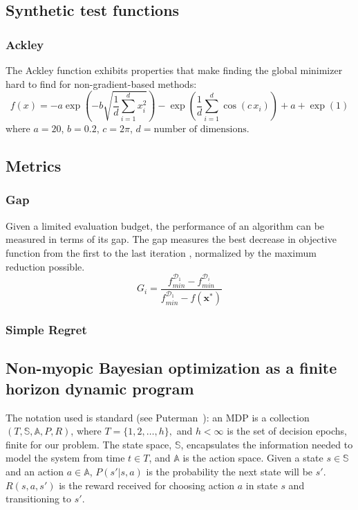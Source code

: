 \documentclass{article}
\newcommand{\bfx}{\textbf{x}}
\begin{document}
\subsection{Synthetic test functions}
\subsubsection{Ackley}
The Ackley function exhibits properties that make finding the
global minimizer hard to find for non-gradient-based methods:
\[
f(x) = -a \exp\left(-b \sqrt{\frac{1}{d} \sum_{i=1}^{d} x_i^2}\right) - \exp\left(\frac{1}{d} \sum_{i=1}^{d} \cos(c \, x_i)\right) + a + \exp(1)
\]
where $a = 20$, $b = 0.2$, $c = 2 \pi$, $d = \text{number of dimensions}$.

\subsection{Metrics}
\subsubsection{Gap}
Given a limited evaluation budget, the performance of an algorithm
can be measured in terms of its gap. The gap measures the best 
decrease in objective function from the first to the last iteration
, normalized by the maximum reduction possible.
\[
G_i = \frac{f_{min}^{\mathcal{D}_1} - f_{min}^{\mathcal{D}_i}}
{f_{min}^{\mathcal{D}_1} - f(\bfx^*)}
\]

\subsubsection{Simple Regret}


\subsection{Non-myopic Bayesian optimization as a finite horizon dynamic program}
The notation used is standard (see Puterman~\cite{puterman2014markov}): an MDP is a 
collection $(T, \mathbb{S}, \mathbb{A}, P,  R)$, where $T = \{1,2,\dots,h\},$ 
and $h < \infty$ is the set of decision epochs, 
finite for our problem.
The state space, $\mathbb{S}$, encapsulates %
the information needed to model the system 
from time $t \in T$, and $\mathbb{A}$ is the action space.  Given a state $s \in \mathbb{S}$ and an 
action $a \in \mathbb{A}$, $P(s'|s,a)$ is the probability the next state will be $s'$. 
$R(s,a,s')$ is the reward received for choosing action $a$ in state $s$
and transitioning to $s'$.
\end{document}
